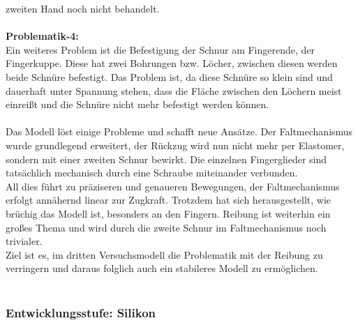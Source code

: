 \documentclass[titlepage,12pt,twoside]{article}
\begin{document}
zweiten Hand noch nicht behandelt. \\
\\
\textbf{Problematik-4: } \\
Ein weiteres Problem ist die Befestigung der Schnur am Fingerende, der Fingerkuppe. Diese hat zwei Bohrungen bzw. Löcher, zwischen diesen werden beide Schnüre befestigt. Das Problem ist, da diese Schnüre so klein sind und dauerhaft 
unter Spannung stehen, dass die Fläche zwischen den Löchern meist einreißt und die Schnüre nicht mehr befestigt werden können. \\
\\
Das Modell löst einige Probleme und schafft neue Ansätze. Der Faltmechanismus wurde grundlegend erweitert, der Rückzug wird nun nicht mehr per Elastomer, sondern mit einer zweiten Schnur bewirkt.
Die einzelnen Fingerglieder sind tatsächlich mechanisch durch eine Schraube miteinander verbunden. \\
All dies führt zu präziseren und genaueren Bewegungen, der Faltmechanismus erfolgt annähernd linear zur Zugkraft. Trotzdem hat sich herausgestellt, wie brüchig das Modell ist, besonders an den Fingern. Reibung ist weiterhin ein großes Thema und 
wird durch die zweite Schnur im Faltmechanismus noch trivialer. \\
Ziel ist es, im dritten Versuchsmodell die Problematik mit der Reibung zu verringern und daraus folglich auch ein stabileres Modell zu ermöglichen.\\
\\

\subsubsection{Entwicklungsstufe: Silikon}
\label{chap:Entwicklungsstufe: Silikon}
\end{document}
